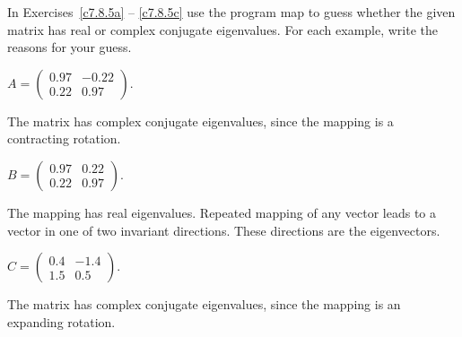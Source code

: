 \documentclass{ximera}
\begin{document}
\CEXER



\noindent In Exercises~\ref{c7.8.5a} -- \ref{c7.8.5c} use the program
{\sf map} to guess whether the given matrix has real or complex conjugate
eigenvalues.  For each example, write the reasons for your guess.
\begin{exercise} \label{c7.8.5a}
$A=\left(\begin{array}{rr} 0.97 & -0.22\\ 0.22 & 0.97
\end{array}\right)$.

\begin{solution}
The matrix has complex conjugate eigenvalues, since the
mapping is a contracting rotation.

\end{solution}
\end{exercise}
\begin{exercise} \label{c7.8.5b}
$B=\left(\begin{array}{rr} 0.97 & 0.22\\ 0.22 & 0.97
\end{array}\right)$.

\begin{solution}
The mapping has real eigenvalues.  Repeated mapping of any
vector leads to a vector in one of two invariant directions.  These
directions are the eigenvectors.

\end{solution}
\end{exercise}
\begin{exercise} \label{c7.8.5c}
$C=\left(\begin{array}{rr} 0.4 & -1.4\\ 1.5 & 0.5
\end{array}\right)$.

\begin{solution}
The matrix has complex conjugate eigenvalues, since the
mapping is an expanding rotation.

\end{solution}
\end{exercise}
\end{document}
